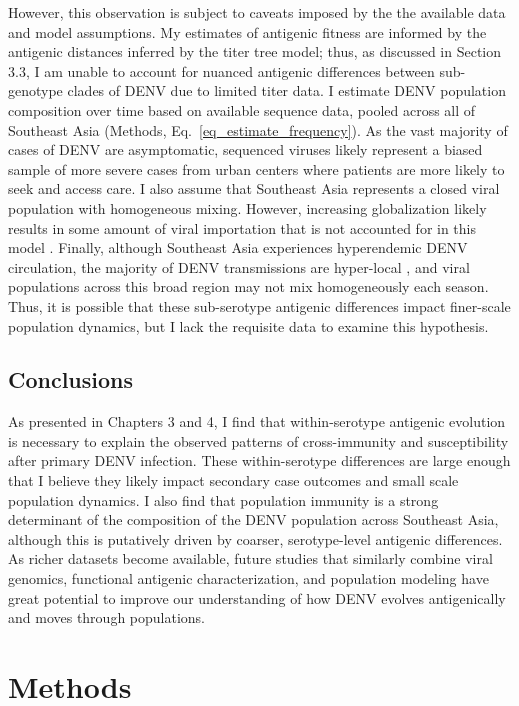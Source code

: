 However, this observation is subject to caveats imposed by the the available data and model assumptions.
My estimates of antigenic fitness are informed by the antigenic distances inferred by the titer tree model; thus, as discussed in Section 3.3, I am unable to account for nuanced antigenic differences between sub-genotype clades of DENV due to limited titer data.
I estimate DENV population composition over time based on available sequence data, pooled across all of Southeast Asia (Methods, Eq.~\ref{eq_estimate_frequency}).
As the vast majority of cases of DENV are asymptomatic, sequenced viruses likely represent a biased sample of more severe cases from urban centers where patients are more likely to seek and access care.
I also assume that Southeast Asia represents a closed viral population with homogeneous mixing.
However, increasing globalization likely results in some amount of viral importation that is not accounted for in this model \citep{allicock2012phylogeography}.
Finally, although Southeast Asia experiences hyperendemic DENV circulation, the majority of DENV transmissions are hyper-local \citep{salje2017dengue}, and viral populations across this broad region may not mix homogeneously each season.
Thus, it is possible that these sub-serotype antigenic differences impact finer-scale population dynamics, but I lack the requisite data to examine this hypothesis.

\subsection{Conclusions}
As presented in Chapters 3 and 4, I find that within-serotype antigenic evolution is necessary to explain the observed patterns of cross-immunity and susceptibility after primary DENV infection.
These within-serotype differences are large enough that I believe they likely impact secondary case outcomes and small scale population dynamics.
I also find that population immunity is a strong determinant of the composition of the DENV population across Southeast Asia, although this is putatively driven by coarser, serotype-level antigenic differences.
As richer datasets become available, future studies that similarly combine viral genomics, functional antigenic characterization, and population modeling have great potential to improve our understanding of how DENV evolves antigenically and moves through populations.

\clearpage

\section{Methods}

